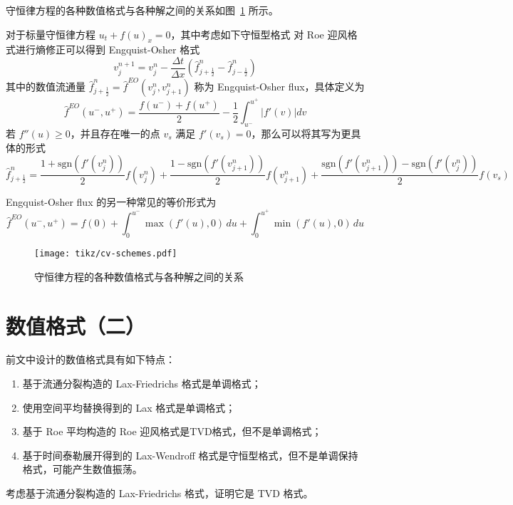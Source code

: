 守恒律方程的各种数值格式与各种解之间的关系如图~\ref{fig:cv-schemes} 所示。

\begin{example}\label{eg:engquist-osher}
    对于标量守恒律方程 $u_t + f(u)_x = 0$，其中考虑如下守恒型格式
    对 Roe 迎风格式进行熵修正可以得到 Engquist-Osher 格式
    \[
        v_j^{n+1} = v_j^n - \frac{\Delta t}{\Delta x}\left( \hat{f}_{j+\frac12}^n - \hat{f}_{j-\frac12}^n \right)
    \]
    其中的数值流通量 $\hat{f}_{j+\frac12}^n = \hat{f}^{EO}(v_j^n,v_{j+1}^n)$ 称为 Engquist-Osher flux，具体定义为
    \[
        \hat{f}^{EO}(u^-,u^+) = \frac{f(u^-) + f(u^+)}2 - \frac12 \int_{u^-}^{u^+} |f'(v)| dv
    \]
    若 $f''(u) \ge 0$，并且存在唯一的点 $v_s$ 满足 $f'(v_s) = 0$，那么可以将其写为更具体的形式
    \[
        \hat{f}_{j+\frac12}^n = \frac{1+\text{sgn}(f'(v_j^n))}2 f(v_j^n) + \frac{1-\text{sgn}(f'(v_{j+1}^n))}2 f(v_{j+1}^n)
        + \frac{\text{sgn}(f'(v_{j+1}^n)) - \text{sgn}(f'(v_j^n))}2 f(v_s)
    \]
\end{example}

\begin{remark}
    Engquist-Osher flux 的另一种常见的等价形式为
    \[
        \hat{f}^{EO}(u^-,u^+) = f(0) + \int_0^{u^-} \max(f'(u),0) \,du + \int_0^{u^+} \min(f'(u),0) \,du
    \]
\end{remark}


\begin{figure}[htbp]
    \centering
    \texttt{[image: tikz/cv-schemes.pdf]}
    \caption{守恒律方程的各种数值格式与各种解之间的关系} \label{fig:cv-schemes}
\end{figure}


\section{数值格式（二）}

前文中设计的数值格式具有如下特点：
\begin{enumerate}
    \item 基于流通分裂构造的 Lax-Friedrichs 格式是单调格式；
    \item 使用空间平均替换得到的 Lax 格式是单调格式；
    \item 基于 Roe 平均构造的 Roe 迎风格式是TVD格式，但不是单调格式；
    \item 基于时间泰勒展开得到的 Lax-Wendroff 格式是守恒型格式，但不是单调保持格式，可能产生数值振荡。
\end{enumerate}


\begin{example}\label{eg:lax-friedrichs}
    考虑基于流通分裂构造的 Lax-Friedrichs 格式，证明它是 TVD 格式。
\end{example}

